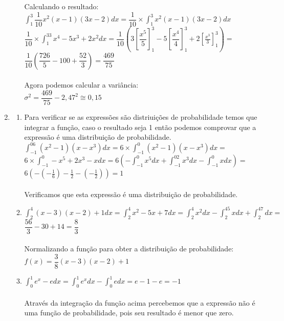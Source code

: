 \documentclass[a4paper, 12pt]{article}
\begin{document}
\begin{enumerate}
\begin{enumerate}
Calculando o resultado: \\
$\int _1^3\dfrac{1}{10}x^2\left(x-1\right)\left(3x-2\right)dx = \dfrac{1}{10}\times \int _1^3x^2\left(x-1\right)\left(3x-2\right)dx$\\
$\dfrac{1}{10}\times \int _1^33x^4-5x^3+2x^2dx = \dfrac{1}{10}(3\left[\dfrac{x^5}{5}\right]^3_1 - 5\left[\dfrac{x^4}{4}\right]^3_1 + 2\left[\frac{x^3}{3}\right]^3_1) = $ \\
$\dfrac{1}{10}(\dfrac{726}{5} - 100 + \dfrac{52}{3}) = \dfrac{469}{75}$\\ \\
Agora podemos calcular a variância: \\ 
$\sigma^2 = \dfrac{469}{75} -2,47^2 \cong 0,15$ 
\end{enumerate}
\newpage
\item \begin{enumerate}
\item Para verificar se as expressões são distriuições de probabilidade temos que integrar a função, caso o resultado seja 1  então podemos comprovar que a expressão é uma distribuição de probabilidade. \\

$\int _{-1}^06\left(x^2-1\right)\left(x-x^3\right)dx = 6 \times \int _{-1}^0\left(x^2-1\right)\left(x-x^3\right)dx =$\\
$6\times \int _{-1}^0-x^5+2x^3-xdx = 6\left(-\int _{-1}^0x^5dx+\int _{-1}^02x^3dx-\int _{-1}^0xdx\right) = $\\
$6\left(-\left(-\frac{1}{6}\right)-\frac{1}{2}-\left(-\frac{1}{2}\right)\right) =  1$\\ \\
Verificamos que esta expressão é uma distribuição de probabilidade.\\ 
\item $\int _2^4\left(x-3\right)\left(x-2\right)+1dx = \int _2^4x^2-5x+7dx = \int _2^4x^2dx-\int _2^45xdx+\int _2^47dx = $ \\
$\dfrac{56}{3}-30+14 = \dfrac{8}{3}$ \\ \\

Normalizando a função para obter a distribuição de probabilidade: \\
$f(x) = \dfrac{3}{8}(x-3)(x-2)+1$ \\

\item $\int _0^1e^x-edx = \int _0^1e^xdx-\int _0^1edx = e-1-e = -1$ \\ \\
Através da integração da função acima percebemos que a expressão não é uma função de probabilidade, pois seu resultado é menor que zero.


\end{enumerate}
\end{enumerate}
\end{document}
